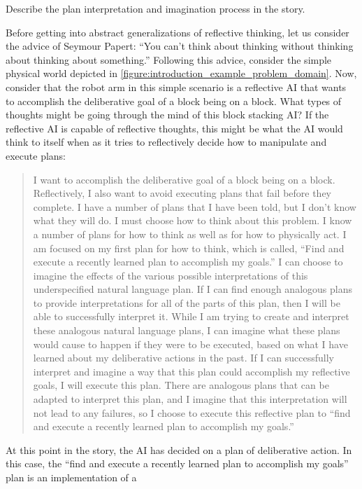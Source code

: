 Describe the plan interpretation and imagination process in the story.

Before getting into abstract generalizations of reflective thinking,
let us consider the advice of Seymour Papert: ``You can't think about
thinking without thinking about thinking about something.''  Following
this advice, consider the simple physical world depicted in
{\autoref{figure:introduction_example_problem_domain}}.  Now, consider
that the robot arm in this simple scenario is a reflective AI that
wants to accomplish the deliberative goal of a block being on a block.
What types of thoughts might be going through the mind of this block
stacking AI?  If the reflective AI is capable of reflective thoughts,
this might be what the AI would think to itself when as it tries to
reflectively decide how to manipulate and execute plans:
\begin{quote}
  I want to accomplish the deliberative goal of a block being on a
  block.  Reflectively, I also want to avoid executing plans that fail
  before they complete.  I have a number of plans that I have been
  told, but I don't know what they will do.  I must choose how to
  think about this problem.  I know a number of plans for how to think
  as well as for how to physically act.  I am focused on my first plan
  for how to think, which is called, ``Find and execute a recently
  learned plan to accomplish my goals.''  I can choose to imagine the
  effects of the various possible interpretations of this
  underspecified natural language plan.  If I can find enough
  analogous plans to provide interpretations for all of the parts of
  this plan, then I will be able to successfully interpret it.  While
  I am trying to create and interpret these analogous natural language
  plans, I can imagine what these plans would cause to happen if they
  were to be executed, based on what I have learned about my
  deliberative actions in the past.  If I can successfully interpret
  and imagine a way that this plan could accomplish my reflective
  goals, I will execute this plan.  There are analogous plans that can
  be adapted to interpret this plan, and I imagine that this
  interpretation will not lead to any failures, so I choose to execute
  this reflective plan to ``find and execute a recently learned plan
  to accomplish my goals.''
\end{quote}
At this point in the story, the AI has decided on a plan of
deliberative action.  In this case, the ``find and execute a recently
learned plan to accomplish my goals'' plan is an implementation of a
